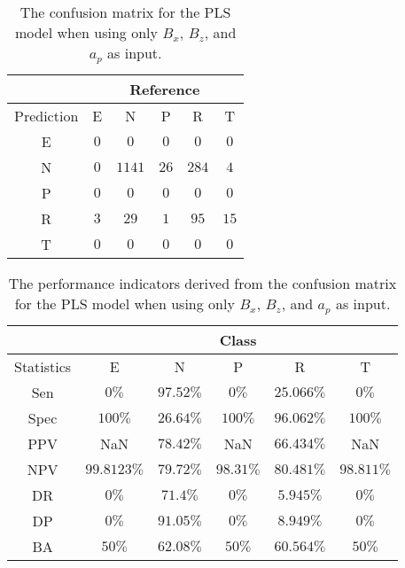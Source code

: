 \begin{table}[!ht]
	\centering
	\begin{tabular}{|c|c|c|c|c|c|}
		\hline
		 & \multicolumn{5}{|c|}{Reference} \\ \hline
		 Prediction & E & N & P & R & T \\ \hline
		 E & $0$ & $0$ & $0$ & $0$ & $0$ \\ \hline
		 N & $0$ & $1141$ & $26$ & $284$ & $4$ \\ \hline
		 P & $0$ & $0$ & $0$ & $0$ & $0$ \\ \hline
		 R & $3$ & $29$ & $1$ & $95$ & $15$ \\ \hline
		 T & $0$ & $0$ & $0$ & $0$ & $0$ \\ \hline
	\end{tabular}
	\caption{The confusion matrix for the PLS model when using only $B_{x}$, $B_{z}$, and $a_{p}$ as input.}
	\label{tab:cm:xzap:pls}
\end{table}

\begin{table}[!ht]
	\centering
	\begin{tabular}{|c|c|c|c|c|c|}
		\hline
		 & \multicolumn{5}{c|}{Class} \\ \hline
		Statistics & E & N & P & R & T \\ \hline
		Sen & $0\%$ & $97.52\%$ & $0\%$ & $25.066\%$ & $0\%$ \\ \hline
		Spec & $100\%$ & $26.64\%$ & $100\%$ & $96.062\%$ & $100\%$ \\ \hline
		PPV & NaN & $78.42\%$ & NaN & $66.434\%$ & NaN \\ \hline
		NPV & $99.8123\%$ & $79.72\%$ & $98.31\%$ & $80.481\%$ & $98.811\%$ \\ \hline
		DR & $0\%$ & $71.4\%$ & $0\%$ & $5.945\%$ & $0\%$ \\ \hline
		DP & $0\%$ & $91.05\%$ & $0\%$ & $8.949\%$ & $0\%$ \\ \hline
		BA & $50\%$ & $62.08\%$ & $50\%$ & $60.564\%$ & $50\%$ \\ \hline
	\end{tabular}
	\caption{The performance indicators derived from the confusion matrix for the PLS model when using only $B_{x}$, $B_{z}$, and $a_{p}$ as input.}
	\label{tab:cs:reverse:xzap:pls}
\end{table}

